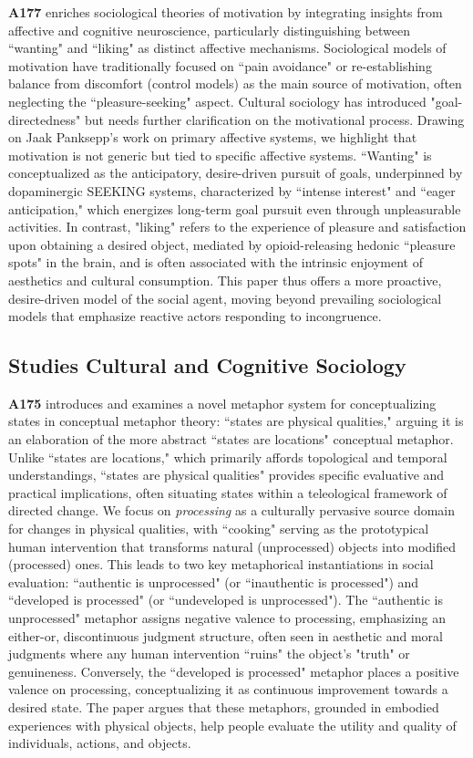 \documentclass[a4paper,11pt]{extarticle}
\begin{document}
\textbf{A177} enriches sociological theories of motivation by integrating insights from affective and cognitive neuroscience, particularly distinguishing between ``wanting" and ``liking" as distinct affective mechanisms. Sociological models of motivation have traditionally focused on ``pain avoidance" or re-establishing balance from discomfort (control models) as the main source of motivation, often neglecting the ``pleasure-seeking" aspect. Cultural sociology has introduced "goal-directedness" but needs further clarification on the motivational process. Drawing on Jaak Panksepp's work on primary affective systems, we highlight that motivation is not generic but tied to specific affective systems. ``Wanting" is conceptualized as the anticipatory, desire-driven pursuit of goals, underpinned by dopaminergic SEEKING systems, characterized by ``intense interest" and ``eager anticipation," which energizes long-term goal pursuit even through unpleasurable activities. In contrast, "liking" refers to the experience of pleasure and satisfaction upon obtaining a desired object, mediated by opioid-releasing hedonic ``pleasure spots" in the brain, and is often associated with the intrinsic enjoyment of aesthetics and cultural consumption. This paper thus offers a more proactive, desire-driven model of the social agent, moving beyond prevailing sociological models that emphasize reactive actors responding to incongruence. 

\subsection*{Studies Cultural and Cognitive Sociology}

\textbf{A175} introduces and examines a novel metaphor system for conceptualizing states in conceptual metaphor theory: ``states are physical qualities," arguing it is an elaboration of the more abstract ``states are locations" conceptual metaphor. Unlike ``states are locations," which primarily affords topological and temporal understandings, ``states are physical qualities" provides specific evaluative and practical implications, often situating states within a teleological framework of directed change. We focus on \textit{processing} as a culturally pervasive source domain for changes in physical qualities, with ``cooking" serving as the prototypical human intervention that transforms natural (unprocessed) objects into modified (processed) ones. This leads to two key metaphorical instantiations in social evaluation: ``authentic is unprocessed" (or ``inauthentic is processed") and ``developed is processed" (or ``undeveloped is unprocessed"). The ``authentic is unprocessed" metaphor assigns negative valence to processing, emphasizing an either-or, discontinuous judgment structure, often seen in aesthetic and moral judgments where any human intervention ``ruins" the object's "truth" or genuineness. Conversely, the ``developed is processed" metaphor places a positive valence on processing, conceptualizing it as continuous improvement towards a desired state. The paper argues that these metaphors, grounded in embodied experiences with physical objects, help people evaluate the utility and quality of individuals, actions, and objects.
\end{document}
